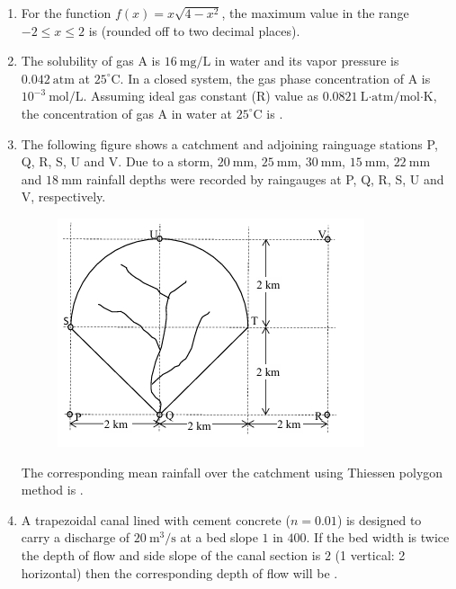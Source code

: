 \documentclass[journal,12pt,onecolumn]{IEEEtran}
\theoremstyle{remark}
\begin{document}
\begin{enumerate}
\item For the function $f(x) = x\sqrt{4 - x^2}$, the maximum value in the range $-2 \leq x \leq 2$ is \underline{\hspace{2cm}} (rounded off to two decimal places). \hfill{}

\item The solubility of gas A is $16\ \text{mg/L}$ in water and its vapor pressure is $0.042\ \text{atm}$ at $25^\circ$C. In a closed system, the gas phase concentration of A is $10^{-3}\ \text{mol/L}$. Assuming ideal gas constant (R) value as $0.0821\ \text{L·atm/mol·K}$, the concentration of gas A in water at $25^\circ$C is \underline{\hspace{2cm}} . \hfill{}

\newpage

\item The following figure  shows a catchment  and adjoining rainguage stations P, Q, R, S, U and V. Due to a storm, $20\ \text{mm}$, $25\ \text{mm}$, $30\ \text{mm}$, $15\ \text{mm}$, $22\ \text{mm}$ and $18\ \text{mm}$ rainfall depths were recorded by raingauges at P, Q, R, S, U and V, respectively.
\begin{center}
\begin{figure}[h]
    \centering
    \includegraphics[width=0.5\linewidth]{figs/img 4.jpeg}
    \caption{}
    \label{fig:placeholder}
\end{figure}
\end{center}

The corresponding mean rainfall over the catchment using Thiessen polygon method is \underline{\hspace{2cm}} . \hfill{}

\item A trapezoidal canal lined with cement concrete ($n = 0.01$) is designed to carry a discharge of $20\ \text{m}^3/\text{s}$ at a bed slope $1$ in $400$. If the bed width is twice the depth of flow and side slope of the canal section is $2$ (1 vertical: 2 horizontal) then the corresponding depth of flow will be \underline{\hspace{2cm}} . \hfill{}


\end{enumerate}
\end{document}
